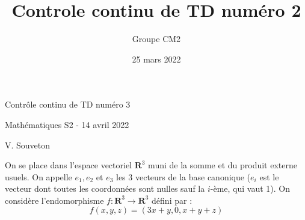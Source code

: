 \documentclass[french]{article}
\title{Controle continu de TD numéro 2}
\author{Groupe CM2}
\date{25 mars 2022}
\begin{document}
\thispagestyle{empty}

\begin{center}
	\Large Contrôle continu de TD numéro 3 
	
	\large Mathématiques S2 - 14 avril 2022
	
	\large V. Souveton
\end{center}

\vspace{0.5\baselineskip}

\noindent
On se place dans l'espace vectoriel $\mathbf{R}^3$ muni de la somme et du produit externe usuels. On appelle $e_1, e_2$ et $e_3$ les 3 vecteurs de la base canonique ($e_i$ est le vecteur dont toutes les coordonnées sont nulles sauf la $i$-ème, qui vaut 1). On considère l'endomorphisme $f : \mathbf{R}^3 \to \mathbf{R}^3$ défini par :
\begin{equation*}
	f(x,y,z) = (3x+y,0,x+y+z)
\end{equation*}
\end{document}
